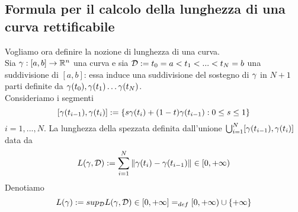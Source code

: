 \subsection{ Formula per il calcolo della lunghezza di una curva rettificabile}
Vogliamo ora definire la nozione di lunghezza di una curva.\\
Sia $\gamma:[a,b]\to\mathbb{R}^n$ una curva e sia $\mathcal{D} := {t_0 = a < t_1 < ... < t_N = b}$ 
una suddivisione di $[a,b]$: essa induce una suddivisione del sostegno di 
$\gamma$ in $N+1$ parti definite da 
$\gamma(t_0),\gamma(t_1)\dots \gamma(t_N)$. \\
Consideriamo i segmenti
$$[\gamma(t_{i-1}),\gamma(t_i)] := \{s\gamma(t_i)+(1-t)\gamma(t_{i-1}) : 0 \leq s \leq 1\}$$
$i = 1,...,N$. La lunghezza della spezzata definita dall'unione 
$\bigcup_{i=1}^{N} [\gamma(t_{i-1}),\gamma(t_i)]$ \ace data da 
$$L(\gamma,\mathcal{D}) := \sum_{i=1}^{N} \left\lVert\gamma(t_i)-\gamma(t_{i-1})\right\rVert \in [0,+\infty)$$
Denotiamo 
$$L(\gamma) := sup_{\mathcal{D}} L(\gamma,\mathcal{D}) \in [0,+\infty] =_{def} [0,+\infty) \cup \{+\infty\}$$